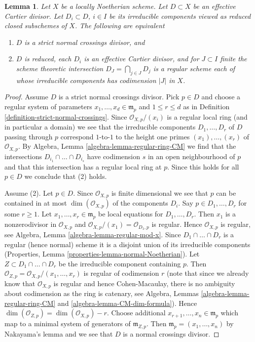 \documentclass[10pt,a4paper]{amsart}
\theoremstyle{plain}
\newtheorem{lemma}[subsection]{Lemma}
\theoremstyle{definition}
\theoremstyle{remark}
\numberwithin{equation}{subsection}
\begin{document}
\begin{lemma}
\label{lemma-strict-normal-crossings}
Let $X$ be a locally Noetherian scheme. Let $D \subset X$ be an
effective Cartier divisor. Let $D_i \subset D$, $i \in I$ be its
irreducible components viewed as reduced closed subschemes of $X$.
The following are equivalent
\begin{enumerate}
\item $D$ is a strict normal crossings divisor, and
\item $D$ is reduced, each $D_i$ is an effective Cartier divisor, and
for $J \subset I$ finite the scheme theoretic
intersection $D_J = \bigcap_{j \in J} D_j$ is a
regular scheme each of whose irreducible components has
codimension $|J|$ in $X$.
\end{enumerate}
\end{lemma}

\begin{proof}
Assume $D$ is a strict normal crossings divisor. Pick $p \in D$
and choose a regular system of parameters $x_1, \ldots, x_d \in \mathfrak m_p$
and $1 \leq r \leq d$ as in
Definition \ref{definition-strict-normal-crossings}.
Since $\mathcal{O}_{X, p}/(x_i)$ is a regular local ring
(and in particular a domain) we see that the irreducible components
$D_1, \ldots, D_r$ of $D$ passing through $p$ correspond $1$-to-$1$
to the height one primes $(x_1), \ldots, (x_r)$ of $\mathcal{O}_{X, p}$.
By Algebra, Lemma \ref{algebra-lemma-regular-ring-CM}
we find that the intersections $D_{i_1} \cap \ldots \cap D_{i_s}$
have codimension $s$ in an open neighbourhood of $p$
and that this intersection has a regular local ring at $p$.
Since this holds for all $p \in D$ we conclude that (2) holds.

\medskip\noindent
Assume (2). Let $p \in D$. Since $\mathcal{O}_{X, p}$ is finite
dimensional we see that $p$ can be contained in at most
$\dim(\mathcal{O}_{X, p})$ of the components $D_i$.
Say $p \in D_1, \ldots, D_r$ for some $r \geq 1$.
Let $x_1, \ldots, x_r \in \mathfrak m_p$ be local equations
for $D_1, \ldots, D_r$. Then $x_1$ is a nonzerodivisor in $\mathcal{O}_{X, p}$
and $\mathcal{O}_{X, p}/(x_1) = \mathcal{O}_{D_1, p}$ is regular.
Hence $\mathcal{O}_{X, p}$ is regular, see
Algebra, Lemma \ref{algebra-lemma-regular-mod-x}.
Since $D_1 \cap \ldots \cap D_r$ is a regular (hence normal) scheme
it is a disjoint union of its irreducible components
(Properties, Lemma \ref{properties-lemma-normal-Noetherian}).
Let $Z \subset D_1 \cap \ldots \cap D_r$
be the irreducible component containing $p$.
Then $\mathcal{O}_{Z, p} = \mathcal{O}_{X, p}/(x_1, \ldots, x_r)$
is regular of codimension $r$ (note that since we already know
that $\mathcal{O}_{X, p}$ is regular and hence Cohen-Macaulay,
there is no ambiguity about codimension as the ring is catenary, see
Algebra, Lemmas \ref{algebra-lemma-regular-ring-CM} and
\ref{algebra-lemma-CM-dim-formula}).
Hence $\dim(\mathcal{O}_{Z, p}) = \dim(\mathcal{O}_{X, p}) - r$.
Choose additional $x_{r + 1}, \ldots, x_n \in \mathfrak m_p$
which map to a minimal system of generators of $\mathfrak m_{Z, p}$.
Then $\mathfrak m_p = (x_1, \ldots, x_n)$ by Nakayama's lemma
and we see that $D$ is a normal crossings divisor.
\end{proof}
\end{document}
